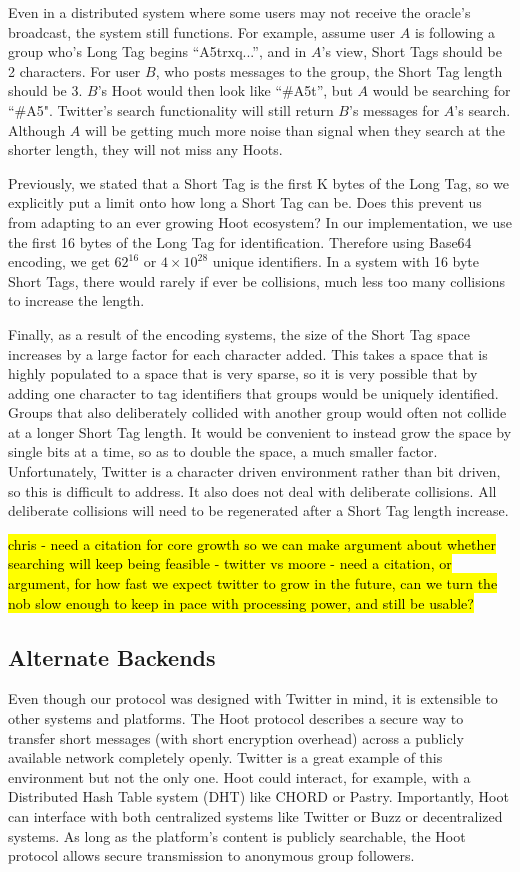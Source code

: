 Even in a distributed system where some users may not receive the oracle's broadcast, the system still functions. For example, assume user $A$ is following a group who's Long Tag begins ``A5trxq...'', and in $A$'s view, Short Tags should be 2 characters. For user $B$, who posts messages to the group, the Short Tag length should be 3. $B$'s Hoot would then look like ``\#A5t'', but $A$ would be searching for ``\#A5". Twitter's search functionality will still return $B$'s messages for $A$'s search. Although $A$ will be getting much more noise than signal when they search at the shorter length, they will not miss any Hoots.

Previously, we stated that a Short Tag is the first K bytes of the Long Tag, so we explicitly put a limit onto how long a Short Tag can be. Does this prevent us from adapting to an ever growing Hoot ecosystem? In our implementation, we use the first 16 bytes of the Long Tag for identification. Therefore using Base64 encoding, we get $62^{16}$ or $4\times10^{28}$ unique identifiers. In a system with 16 byte Short Tags, there would rarely if ever be collisions, much less too many collisions to increase the length.

Finally, as a result of the encoding systems, the size of the Short Tag space increases by a large factor for each character added. This takes a space that is highly populated to a space that is very sparse, so it is very possible that by adding one character to tag identifiers that groups would be uniquely identified. Groups that also deliberately collided with another group would often not collide at a longer Short Tag length. It would be convenient to instead grow the space by single bits at a time, so as to double the space, a much smaller factor. Unfortunately, Twitter is a character driven environment rather than bit driven, so this is difficult to address. It also does not deal with deliberate collisions. All deliberate collisions will need to be regenerated after a Short Tag length increase.


\hl{
chris 
- need a citation for core growth so we can make argument about whether searching will keep being feasible
- twitter vs moore
- need a citation, or argument, for how fast we expect twitter to grow in the future, can we turn the nob slow enough to keep in pace with processing power, and still be usable? 
}

\subsection{Alternate Backends}

Even though our protocol was designed with Twitter in mind, it is extensible to other systems and platforms. The Hoot protocol describes a secure way to transfer short messages (with short encryption overhead) across a publicly available network completely openly. Twitter is a great example of this environment but not the only one. Hoot could interact, for example, with a Distributed Hash Table system (DHT) like CHORD or Pastry. Importantly, Hoot can interface with both centralized systems like Twitter or Buzz or decentralized systems. As long as the platform's content is publicly searchable, the Hoot protocol allows secure transmission to anonymous group followers.